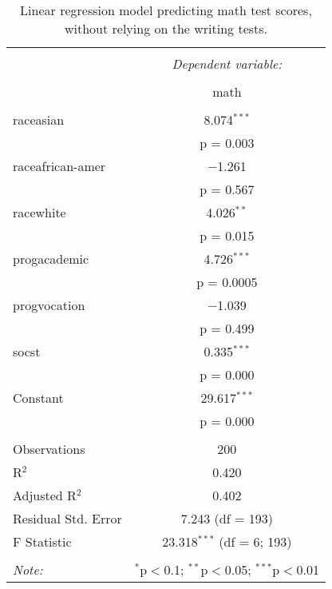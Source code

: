 
\begin{table}[!htbp] \centering 
  \caption{Linear regression model predicting math test scores, 
          without relying on the writing tests.} 
  \label{tab::lm_math_nopeeking} 
\begin{tabular}{@{\extracolsep{5pt}}lc} 
\\[-1.8ex]\hline 
\hline \\[-1.8ex] 
 & \multicolumn{1}{c}{\textit{Dependent variable:}} \\ 
\cline{2-2} 
\\[-1.8ex] & math \\ 
\hline \\[-1.8ex] 
 raceasian & 8.074$^{***}$ \\ 
  & p = 0.003 \\ 
  raceafrican-amer & $-$1.261 \\ 
  & p = 0.567 \\ 
  racewhite & 4.026$^{**}$ \\ 
  & p = 0.015 \\ 
  progacademic & 4.726$^{***}$ \\ 
  & p = 0.0005 \\ 
  progvocation & $-$1.039 \\ 
  & p = 0.499 \\ 
  socst & 0.335$^{***}$ \\ 
  & p = 0.000 \\ 
  Constant & 29.617$^{***}$ \\ 
  & p = 0.000 \\ 
 \hline \\[-1.8ex] 
Observations & 200 \\ 
R$^{2}$ & 0.420 \\ 
Adjusted R$^{2}$ & 0.402 \\ 
Residual Std. Error & 7.243 (df = 193) \\ 
F Statistic & 23.318$^{***}$ (df = 6; 193) \\ 
\hline 
\hline \\[-1.8ex] 
\textit{Note:}  & \multicolumn{1}{r}{$^{*}$p$<$0.1; $^{**}$p$<$0.05; $^{***}$p$<$0.01} \\ 
\end{tabular} 
\end{table} 
